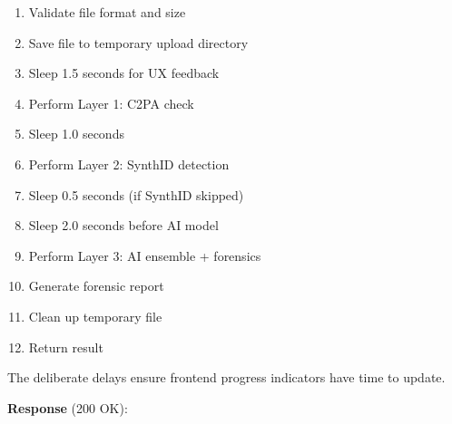 \documentclass[12pt,a4paper]{book}
\begin{document}
\begin{itemize}
\begin{enumerate}
    \item Validate file format and size
    \item Save file to temporary upload directory
    \item Sleep 1.5 seconds for UX feedback
    \item Perform Layer 1: C2PA check
    \item Sleep 1.0 seconds
    \item Perform Layer 2: SynthID detection
    \item Sleep 0.5 seconds (if SynthID skipped)
    \item Sleep 2.0 seconds before AI model
    \item Perform Layer 3: AI ensemble + forensics
    \item Generate forensic report
    \item Clean up temporary file
    \item Return result
\end{enumerate}

The deliberate delays ensure frontend progress indicators have time to update.

\textbf{Response} (200 OK):


\end{itemize}
\end{document}
